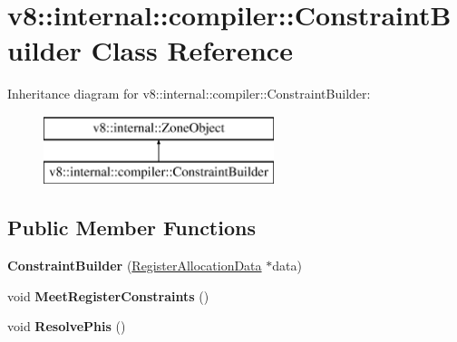 \hypertarget{classv8_1_1internal_1_1compiler_1_1_constraint_builder}{}\section{v8\+:\+:internal\+:\+:compiler\+:\+:Constraint\+Builder Class Reference}
\label{classv8_1_1internal_1_1compiler_1_1_constraint_builder}
Inheritance diagram for v8\+:\+:internal\+:\+:compiler\+:\+:Constraint\+Builder\+:\begin{figure}[H]
\begin{center}
\leavevmode
\includegraphics[height=2.000000cm]{classv8_1_1internal_1_1compiler_1_1_constraint_builder}
\end{center}
\end{figure}
\subsection*{Public Member Functions}
\begin{DoxyCompactItemize}
\item 
{\bfseries Constraint\+Builder} (\hyperlink{classv8_1_1internal_1_1compiler_1_1_register_allocation_data}{Register\+Allocation\+Data} $\ast$data)\hypertarget{classv8_1_1internal_1_1compiler_1_1_constraint_builder_aa89f59cdb50c8029bd8b14c9ef93cf0b}{}\label{classv8_1_1internal_1_1compiler_1_1_constraint_builder_aa89f59cdb50c8029bd8b14c9ef93cf0b}

\item 
void {\bfseries Meet\+Register\+Constraints} ()\hypertarget{classv8_1_1internal_1_1compiler_1_1_constraint_builder_a07a572b8f42f29934d5732f326c301a5}{}\label{classv8_1_1internal_1_1compiler_1_1_constraint_builder_a07a572b8f42f29934d5732f326c301a5}

\item 
void {\bfseries Resolve\+Phis} ()\hypertarget{classv8_1_1internal_1_1compiler_1_1_constraint_builder_a7c8bc9fb22690f82441724350c9088cc}{}\label{classv8_1_1internal_1_1compiler_1_1_constraint_builder_a7c8bc9fb22690f82441724350c9088cc}

\end{DoxyCompactItemize}
